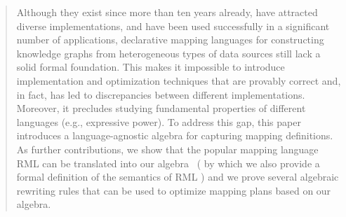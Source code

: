 \begin{abstract}

Although they exist since more than ten years already, have attracted diverse implementations, and have been used successfully in a significant number of applications, declarative mapping languages for constructing
knowledge graphs from heterogeneous types of data sources still lack a solid formal foundation.
	This
%
	makes it impossible to introduce implementation and optimization techniques that are provably correct and, in fact, has led to discrepancies between different implementations. Moreover,
it precludes
	studying fundamental properties of different languages (e.g., expressive power).
To address this gap, this paper introduces a
	language-agnostic
algebra
	for capturing mapping definitions.
As further contributions, we show that the popular mapping language RML can be translated into our algebra%
	~(%
%
	by which we also provide
%
	a
%
formal definition of the semantics of RML%
%
	)
and we prove several algebraic
	rewriting rules that can be used
to optimize mapping plans based on our algebra.

\end{abstract}
